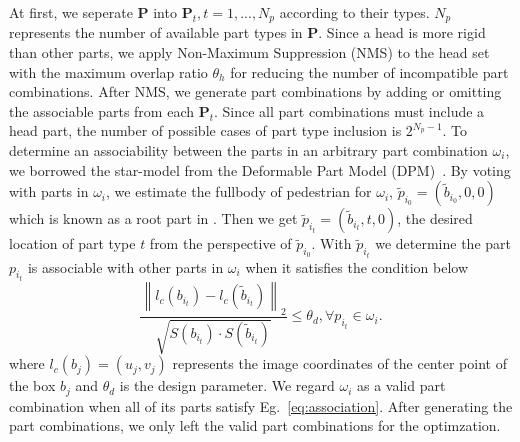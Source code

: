 \documentclass[runningheads]{llncs}
\newcommand{\norm}[1]{\left\lVert#1\right\rVert}
\begin{document}
At first, we seperate $\mathbf{P}$ into $\mathbf{P}_t, t=1,...,N_p$ according to their types.
$N_p$ represents the number of available part types in $\mathbf{P}$.
Since a head is more rigid than other parts, we apply Non-Maximum Suppression (NMS) to the head set with the maximum overlap ratio $\theta_{h}$ for reducing the number of incompatible part combinations.
After NMS, we generate part combinations by adding or omitting the associable parts from each $\mathbf{P}_t$.
Since all part combinations must include a head part, the number of possible cases of part type inclusion is $2^{N_p-1}$.
To determine an associability between the parts in an arbitrary part combination $\omega_i$, we borrowed the star-model from the Deformable Part Model (DPM)~\cite{felzenszwalb2010object}.
By voting with parts in $\omega_i$, we estimate the fullbody of pedestrian for $\omega_i$, $\tilde{p}_{i_0} = (\tilde{b}_{i_0},0,0)$ which is known as a root part in \cite{felzenszwalb2010object}.
Then we get $\tilde{p}_{i_t} = (\tilde{b}_{i_t},t,0)$, the desired location of part type $t$ from the perspective of $\tilde{p}_{i_0}$.
With $\tilde{p}_{i_t}$ we determine the part $p_{i_t}$ is associable with other parts in $\omega_i$ when it satisfies the condition below
\begin{equation}
   \label{eq:association}
   \frac{\norm{l_c(b_{i_t}) - l_c(\tilde{b}_{i_t})}_2}{\sqrt{S(b_{i_t}) \cdot S(\tilde{b}_{i_t})}}  \leq \theta_d, \forall p_{i_t} \in \omega_i.
\end{equation}
where $l_c(b_j) = (u_j,v_j)$ represents the image coordinates of the center point of the box $b_j$ and $\theta_d$ is the design parameter.
We regard $\omega_i$ as a valid part combination when all of its parts satisfy Eg.~\ref{eq:association}.
After generating the part combinations, we only left the valid part combinations for the optimzation.
\end{document}
